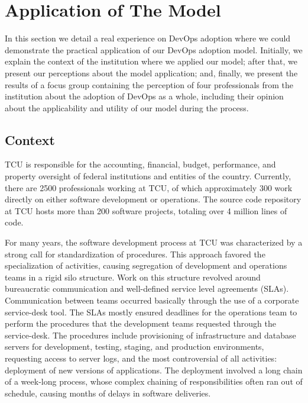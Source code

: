 \section{Application of The Model} \label{sec:TCU}

In this section we detail a real experience on DevOps adoption where we could
demonstrate the practical application of our DevOps adoption model. Initially,
we explain the context of the institution where we applied our model; after that,
we present our perceptions about the model application; and,
finally, we present the results of a focus group containing the perception of
four professionals from the institution about the adoption of DevOps as a whole,
including their opinion about the applicability and utility of our model
during the process.

\subsection{Context}

TCU is responsible for the accounting, financial, budget, performance, and property
oversight of federal institutions and entities of the country. Currently, there are 2500
professionals working at TCU, of which approximately 300 work directly on either
software development or operations. The source code repository at TCU hosts
more than 200 software projects, totaling over 4 million lines of code.

For many years, the software development process at TCU was characterized by a strong call
for standardization of procedures. This approach favored the specialization of
activities, causing segregation of development and operations teams in a rigid
silo structure. Work on this structure revolved around bureaucratic
communication and well-defined service level agreements (SLAs). Communication
between teams occurred basically through the use of a corporate service-desk tool.
The SLAs mostly ensured deadlines for the operations team to perform the
procedures that the development teams requested through the service-desk. The
procedures include provisioning of infrastructure and database servers for
development, testing, staging, and production environments, requesting access
to server logs, and the most controversial of all activities: deployment of new versions
of applications. The deployment involved a long chain of a week-long process,
whose complex chaining of responsibilities often ran out of schedule, causing
months of delays in software deliveries.

